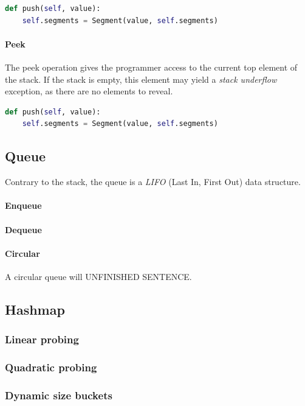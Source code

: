 \documentclass{article}
\begin{document}
\begin{lstlisting}[language=Python]
  def push(self, value):
    self.segments = Segment(value, self.segments)
\end{lstlisting}

\paragraph{Peek}
The peek operation gives the programmer access to the current top element of the stack.
If the stack is empty, this element may yield a {\em stack underflow} exception, as there are no elements to reveal.

\begin{lstlisting}[language=Python]
  def push(self, value):
    self.segments = Segment(value, self.segments)
\end{lstlisting}

\subsection{Queue}
Contrary to the stack, the queue is a {\em LIFO} (Last In, First Out) data structure.

\paragraph{Enqueue}
\paragraph{Dequeue}
\paragraph{Circular}
A circular queue will {\huge UNFINISHED SENTENCE}.

\newpage

\subsection{Hashmap}
\subsubsection{Linear probing}
\subsubsection{Quadratic probing}
\subsubsection{Dynamic size buckets}
\end{document}

